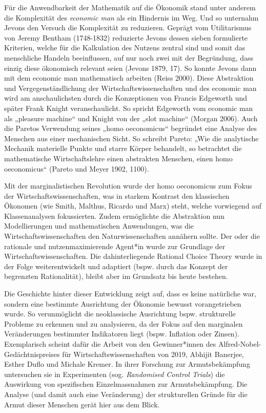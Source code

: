 \documentclass[
  nswissgerman,
  a4paper,
  DIV=11,
  numbers=noendperiod,
  oneside,
  openany]{scrreprt}
\begin{document}
\begin{tcolorbox}
Für die Anwendbarkeit der Mathematik auf die Ökonomik stand unter
anderem die Komplexität des \emph{economic man} als ein Hindernis im
Weg. Und so unternahm Jevons den Versuch die Komplexität zu reduzieren.
Geprägt vom Utilitarismus von Jeremy Bentham (1748-1832) reduzierte
Jevons dessen sieben formulierte Kriterien, welche für die Kalkulation
des Nutzens zentral sind und somit das menschliche Handeln beeinflussen,
auf nur noch zwei mit der Begründung, dass einzig diese ökonomisch
relevant seien (Jevons 1879, 17). So konnte Jevons dann mit dem economic
man mathematisch arbeiten (Reiss 2000). Diese Abstraktion und
Vergegenständlichung der Wirtschaftswissenschaften und des economic man
wird am anschaulichsten durch die Konzeptionen von Francis Edgeworth und
später Frank Knight veranschaulicht. So spricht Edgeworth vom economic
man als „pleasure machine`` und Knight von der „slot machine`` (Morgan
2006). Auch die Paretos Verwendung seines „homo oeconomicus`` begründet
eine Analyse des Menschen aus einer mechanischen Sicht. So schreibt
Pareto: „Wie die analytische Mechanik materielle Punkte und starre
Körper behandelt, so betrachtet die mathematische Wirtschaftslehre einen
abstrakten Menschen, einen homo oeconomicus`` (Pareto und Meyer 1902,
1100).

Mit der marginalistischen Revolution wurde der homo oeconomicus zum
Fokus der Wirtschaftswissenschaften, was in starkem Kontrast den
klassischen Ökonomen (wie Smith, Malthus, Ricardo und Marx) steht,
welche vorwiegend auf Klassenanalysen fokussierten. Zudem ermöglichte
die Abstraktion nun Modellierungen und mathematischen Anwendungen, was
die Wirtschaftswissenschaften den Naturwissenschaften annähern sollte.
Der oder die rationale und nutzenmaximierende Agent*in wurde zur
Grundlage der Wirtschaftswissenschaften. Die dahinterliegende Rational
Choice Theory wurde in der Folge weiterentwickelt und adaptiert (bspw.
durch das Konzept der begrenzten Rationalität), bleibt aber im Grundsatz
bis heute bestehen.

Die Geschichte hinter dieser Entwicklung zeigt auf, dass es keine
natürliche war, sondern eine bestimmte Ausrichtung der Ökonomie bewusst
vorangetrieben wurde. So verunmöglicht die neoklassische Ausrichtung
bspw. strukturelle Probleme zu erkennen und zu analysieren, da der Fokus
auf den marginalen Veränderungen bestimmter Indikatoren liegt (bspw.
Inflation oder Zinsen). Exemplarisch scheint dafür die Arbeit von den
Gewinner*innen des Alfred-Nobel-Gedächtnispreises für
Wirtschaftswissenschaften von 2019, Abhijit Banerjee, Esther Duflo und
Michale Kremer. In ihrer Forschung zur Armutsbekämpfung untersuchen sie
in Experimenten (sog. \emph{Randomised Control Trials}) die Auswirkung
von spezifischen Einzelmassnahmen zur Armutsbekämpfung. Die Analyse (und
damit auch eine Veränderung) der strukturellen Gründe für die Armut
dieser Menschen gerät hier aus dem Blick.


\end{tcolorbox}
\end{document}
